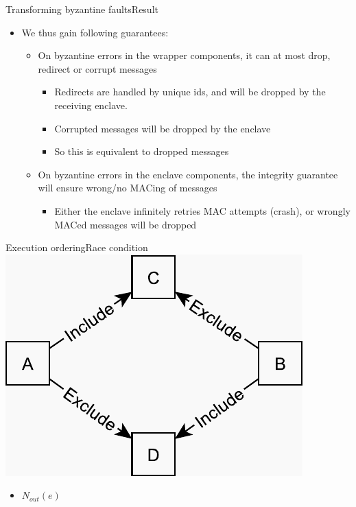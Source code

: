 \documentclass{beamer}
\begin{document}
\begin{frame}{Transforming byzantine faults}{Result}
    \begin{itemize}
    	\item We thus gain following guarantees:

  		\vfill

    	\begin{itemize}
    		\item On byzantine errors in the wrapper components, it can at most drop, redirect or corrupt messages
    		\begin{itemize}
    			\item Redirects are handled by unique ids, and will be dropped by the receiving enclave.
    			\item Corrupted messages will be dropped by the enclave
    			\item So this is equivalent to dropped messages
    		\end{itemize}

	  	\vfill

    		\item On byzantine errors in the enclave components, the integrity guarantee will ensure wrong/no MACing of messages
    		\begin{itemize}
    			\item Either the enclave infinitely retries MAC attempts (crash), or wrongly MACed messages will be dropped
    		\end{itemize}
    	\end{itemize}
    \end{itemize}
\end{frame}

\begin{frame}{Execution ordering}{Race condition}%
	\centering
    \includegraphics[scale=0.5]{figures/race-condition.pdf}
    \vspace{\fill}
    \begin{itemize}
    	\item $N_{out}(e)$
    \end{itemize}
\end{frame}
\end{document}

